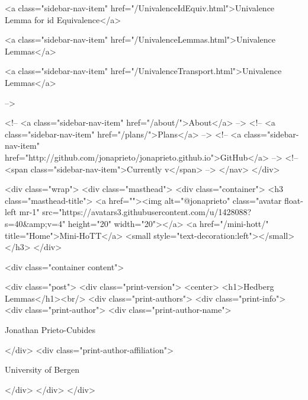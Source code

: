       
    
      
        
          <a class="sidebar-nav-item" href="/UnivalenceIdEquiv.html">Univalence Lemma for id Equivalence</a>
        
      
    
      
        
          <a class="sidebar-nav-item" href="/UnivalenceLemmas.html">Univalence Lemmas</a>
        
      
    
      
        
          <a class="sidebar-nav-item" href="/UnivalenceTransport.html">Univalence Lemmas</a>
        
      
     -->

    <!-- <a class="sidebar-nav-item" href="/about/">About</a> -->
    <!-- <a class="sidebar-nav-item" href="/plans/">Plans</a> -->
    <!-- <a class="sidebar-nav-item" href="http://github.com/jonaprieto/jonaprieto.github.io">GitHub</a> -->
    <!-- <span class="sidebar-nav-item">Currently v</span> -->
  </nav>
</div>

    <div class="wrap">
      <div class="masthead">
        <div class="container">
          <h3 class="masthead-title">
            <a href=""><img alt="@jonaprieto" class="avatar float-left mr-1" src="https://avatars3.githubusercontent.com/u/1428088?s=40&amp;v=4" height="20" width="20"></a>
            <a href="/mini-hott/" title="Home">Mini-HoTT</a>
            <small style="text-decoration:left"></small>
          </h3>
        </div>
      
      <div class="container content">
        







<div class="post">
  <div class="print-version">
    <center>
      <h1>Hedberg Lemmas</h1><br/>
        <div class="print-authors">
          <div class="print-info">
            <div class="print-author">
              <div class="print-author-name">
                
                  Jonathan Prieto-Cubides
                
              </div>
              <div class="print-author-affiliation">
                
                  University of Bergen
                
                </div>
            </div>
          </div>
          
